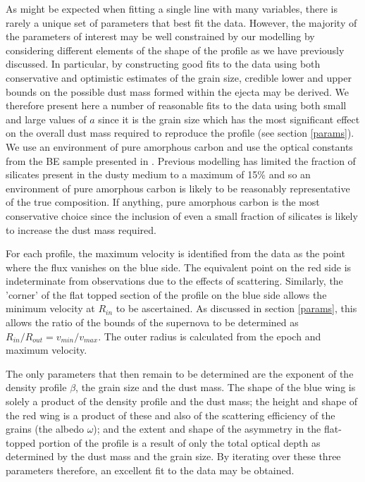 \documentclass[useAMS,usenatbib,usegraphicx]{mnras}
\begin{document}
As might be expected when fitting a single line with many variables, there is rarely a unique set of parameters that best fit the data.  However, the majority of the parameters of interest may be well constrained by our modelling by considering different elements of the shape of the profile as we have previously discussed.   In particular, by constructing good fits to the data using both conservative and optimistic estimates of the grain size, credible lower and upper bounds on the possible dust mass formed within the ejecta may be derived.  We therefore present here a number of reasonable fits to the data using both small and large values of $a$ since it is the grain size which has the most significant effect on the overall dust mass required to reproduce the profile (see section \ref{params}).  We use an environment of pure amorphous carbon and use the optical constants from the BE sample presented in \citet{Zubko1996}.  Previous modelling has limited the fraction of silicates present in the dusty medium to a maximum of 15\% \citep{Wesson2015,Ercolano2007} and so an environment of pure amorphous carbon is likely to be reasonably representative of the true composition.  If anything, pure amorphous carbon is the most conservative choice since the inclusion of even a small fraction of silicates is likely to increase the dust mass required. 

For each profile, the maximum velocity is identified from the data as the point where the flux vanishes on the blue side.  The equivalent point on the red side is indeterminate from observations due to the effects of scattering.  Similarly, the 'corner' of the flat topped section of the profile on the blue side allows the minimum velocity at $R_{in}$ to be ascertained. As discussed in section \ref{params}, this allows the ratio of the bounds of the supernova to be determined as $R_{in}/R_{out}=v_{min}/v_{max}$.  The outer radius is calculated from the epoch and maximum velocity.

The only parameters that then remain to be determined are the exponent of the density profile $\beta$, the grain size and the dust mass.  The shape of the blue wing is solely a product of the density profile and the dust mass; the height and shape of the red wing is a product of these and also of the scattering efficiency of the grains (the albedo $\omega$); and the extent and shape of the asymmetry in the flat-topped portion of the profile is a result of only the total optical depth as determined by the dust mass and the grain size.  By iterating over these three parameters therefore, an excellent fit to the data may be obtained.
\end{document}
